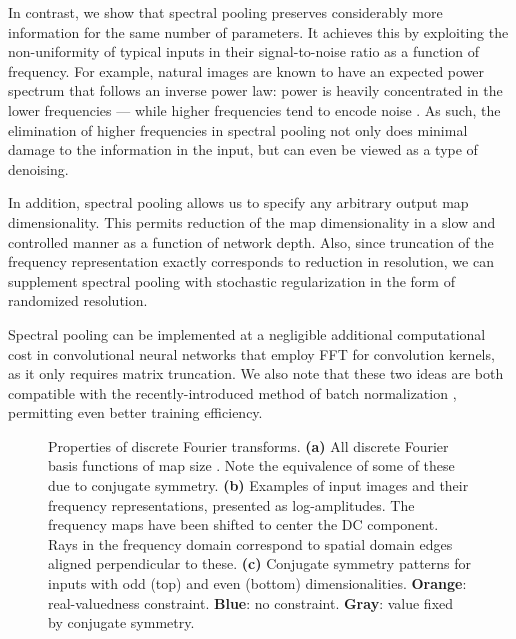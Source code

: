 \documentclass{article} \usepackage{nips15submit_e,times}
\begin{document}
In contrast, we show that spectral pooling preserves considerably more information for the same number of parameters. It achieves this by exploiting the non-uniformity of typical inputs in their signal-to-noise ratio as a function of frequency. For example, natural images are known to have an expected power spectrum that follows an inverse power law: power is heavily concentrated in the lower frequencies --- while higher frequencies tend to encode noise \citep{torralba_statistics_2003}. As such, the elimination of higher frequencies in spectral pooling not only does minimal damage to the information in the input, but can even be viewed as a type of denoising.

In addition, spectral pooling allows us to specify any arbitrary output map dimensionality. This permits reduction of the map dimensionality in a slow and controlled manner as a function of network depth.  Also, since truncation of the frequency representation exactly corresponds to reduction in resolution, we can supplement spectral pooling with stochastic regularization in the form of randomized resolution.

Spectral pooling can be implemented at a negligible additional computational cost in convolutional neural networks that employ FFT for convolution kernels, as it only requires matrix truncation.  We also note that these two ideas are both compatible with the recently-introduced method of batch normalization \citep{DBLP:journals/corr/IoffeS15}, permitting even better training efficiency. 


\begin{figure*}[t]
\centering {}
  \hfill
{}
  \hfill
{}
\caption{Properties of discrete Fourier transforms. {\bf (a)} All discrete Fourier basis functions of map size . Note the equivalence of some of these due to conjugate symmetry. {\bf (b)} Examples of input images and their frequency representations, presented as log-amplitudes. The frequency maps have been shifted to center the DC component. Rays in the frequency domain correspond to spatial domain edges aligned perpendicular to these. {\bf (c)} Conjugate symmetry patterns for inputs with odd (top) and even (bottom) dimensionalities. {\bf Orange}: real-valuedness constraint. {\bf Blue}: no constraint. {\bf Gray}: value fixed by conjugate symmetry.}

\label{fig:dft}
\end{figure*}
\end{document}
